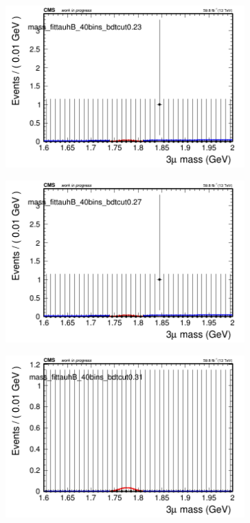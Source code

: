 \begin{figure}[H]
\begin{subfigure}{0.2\textwidth}
        \includegraphics[width=\textwidth]{power_law/plots/tauhB/massfit_tauhB_40bins_bdtcut0.23.png}
        \caption{}
    \end{subfigure}
    \begin{subfigure}{0.2\textwidth}
        \includegraphics[width=\textwidth]{power_law/plots/tauhB/massfit_tauhB_40bins_bdtcut0.27.png}
        \caption{}
    \end{subfigure}
    \begin{subfigure}{0.2\textwidth}
        \includegraphics[width=\textwidth]{power_law/plots/tauhB/massfit_tauhB_40bins_bdtcut0.31.png}

\end{subfigure}
\end{figure}

